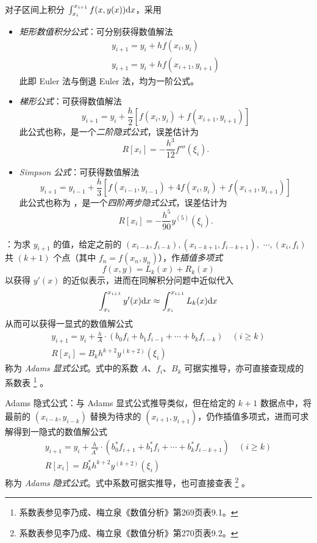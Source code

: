 \entry 对子区间上积分 $\int_{x_i}^{x_{i+1}}f(x,y(x))\mathrm{d} x$，采用
\begin{itemize}
    \item \emph{矩形数值积分公式}：可分别获得数值解法
    \begin{gather}
    y_{i+1}=y_i+hf(x_i,y_i)\\
    y_{i+1}=y_i+hf(x_{i+1},y_{i+1})
    \end{gather}
    此即 Euler 法与倒退 Euler 法，均为一阶公式。
    \item \emph{梯形公式}：可获得数值解法
    \begin{equation}
    y_{i+1}=y_i+\frac h2[f(x_i,y_i)+f(x_{i+1},y_{i+1})]
    \end{equation}
    此公式也称，是一个\emph{二阶隐式公式}，误差估计为
    \begin{equation}
    R[x_i]=-\frac{h^3}{12}f'''(\xi_i).
    \end{equation}
    \item \emph{Simpson 公式}：可获得数值解法
    \begin{equation}
    y_{i+1}=y_{i-1}+\frac h3[f(x_{i-1},y_{i-1})+4f(x_i,y_i)+f(x_{i+1},y_{i+1})]
    \end{equation}
    此公式也称为 ，是一个\emph{四阶两步隐式公式}，误差估计为
    \begin{equation}
    R[x_i]=-\frac{h^5}{90}y^{(5)}(\xi_i).
    \end{equation}
\end{itemize}

\entry {}：为求 $y_{i+1}$ 的值，给定之前的 $(x_{i-k},f_{i-k}),(x_{i-k+1},f_{i-k+1}),$ $\cdots,(x_i,f_i)$ 共 $(k+1)$ 个点（其中 $f_n=f(x_n,y_n)$），作\emph{插值多项式}
\[ f(x,y)=L_k(x)+R_k(x) \]
以获得 $y'(x)$ 的近似表示，进而在同解积分问题中近似代入
\[ \int_{x_i}^{x_{i+1}}y'(x)\mathrm{d} x\approx\int_{x_i}^{x_{i+1}}L_k(x)\mathrm{d} x \]
从而可以获得一显式的数值解公式
\begin{gather}
y_{i+1}=y_i+\frac hA\cdot(b_0f_i+b_1f_{i-1}+\cdots+b_kf_{i-k})\quad(i\geq k)\\
R[x_i]=B_kh^{k+2}y^{(k+2)}(\xi_i)
\end{gather}
称为 \emph{Adams 显式公式}。式中的系数 $A$、$f_i$、$B_k$ 可据实推导，亦可直接查现成的系数表
\footnote{系数表参见李乃成、梅立泉《数值分析》第269页表9.1。}
。

\entry Adams 隐式公式：与 Adams 显式公式推导类似，但在给定的 $k+1$ 数据点中，将最前的 $(x_{i-k},y_{i-k})$ 替换为待求的 $(x_{i+1},y_{i+1})$，仍作插值多项式，进而可求解得到一隐式的数值解公式
\begin{gather}
y_{i+1}=y_i+\frac h{A^\ast}\cdot(b^\ast_0f_{i+1}+b^\ast_1f_i+\cdots+b^\ast_kf_{i
-k+1})\quad(i\geq k)\\
R[x_i]=B^\ast_kh^{k+2}y^{(k+2)}(\xi_i)
\end{gather}
称为 \emph{Adams 隐式公式}。式中系数可据实推导，也可直接查表
\footnote{系数表参见李乃成、梅立泉《数值分析》第270页表9.2。}
。


